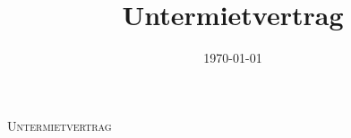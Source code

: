 





\setlength\parindent{0pt}

\makeatletter
\newcommand \MYdotfill {{\color{gray} \leavevmode \cleaders \hb@xt@ .33em{\hss .\hss }\hfill \kern \z@}}
\makeatother


\title{Untermietvertrag}
\author{}
\date{\today}







\fancyfoot[C]{\footnotesize{\thepage}}

{\Huge \textsc{Untermietvertrag}}

\vspace{2cm}



\vspace{-6ex}



\pagebreak
\renewcommand{\headrulewidth}{0.4pt}



\pagebreak



\pagebreak
\fancyfoot[C]{}



\pagebreak
\renewcommand{\headrulewidth}{0.0pt}




